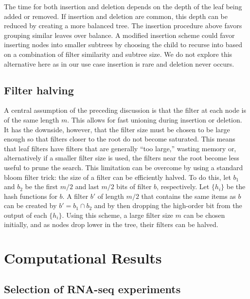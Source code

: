 \documentclass[11pt]{article}
\begin{document}
The time for both insertion and deletion depends on the depth of the leaf being added or removed. If insertion and deletion are common, this depth can be reduced by creating a more balanced tree. The insertion procedure above favors grouping similar leaves over balance. A modified insertion scheme could favor inserting nodes into smaller subtrees by choosing the child to recurse into based on a combination of filter similarity and subtree size. We do not explore this alternative here as in our use case insertion is rare and deletion never occurs.

\subsection{Filter halving}

A central assumption of the preceding discussion is that the filter at each node is of the same length $m$. This allows for fast unioning during insertion or deletion. It has the downside, however, that the filter size must be chosen to be large enough so that filters closer to the root do not become saturated. This means that leaf filters have filters that are generally ``too large,'' wasting memory or, alternatively if a smaller filter size is used, the filters near the root become less useful to prune the search. This limitation can be overcome by using a standard bloom filter trick: the size of a filter can be efficiently halved. To do this, let $b_1$ and $b_2$ be the first $m/2$ and last $m/2$ bits of filter $b$, respectively.  Let $\{h_i\}$ be the hash functions for $b$. A filter $b'$ of length $m/2$ that contains the same items as $b$ can be created by $b' = b_1 \cap b_2$ and by then dropping the high-order bit from the output of each $\{h_i\}$.  Using this scheme, a large filter size $m$ can be chosen initially, and as nodes drop lower in the tree, their filters can be halved. 


\section{Computational Results}

\subsection{Selection of RNA-seq experiments}
\end{document}
